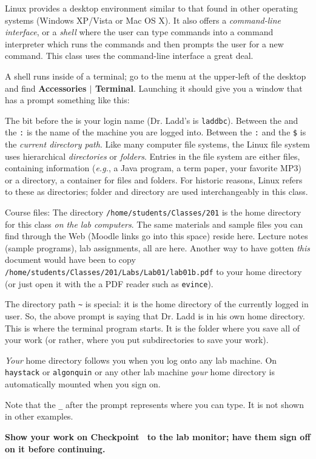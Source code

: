 \documentclass[12pt,twoside]{memoir}
\begin{document}
\begin{Exercise}[name={Checkpoint},title={Launch a terminal.}]
  Linux provides a desktop environment similar to that found in other
  operating systems (Windows XP/Vista or Mac OS X). It also offers a
  \emph{command-line interface}, or a \emph{shell} where the user can
  type commands into a command interpreter which runs the commands and
  then prompts the user for a new command. This class uses the
  command-line interface a great deal.

  A shell runs inside of a terminal; go to the menu at the upper-left
  of the desktop and find \textbf{Accessories $|$ Terminal}. Launching
  it should give you a window that has a prompt something like this:



The bit before the \texttt{\@} is your login name (Dr. Ladd's is
\texttt{laddbc}). Between the \texttt{\@} and the \texttt{:} is the name 
of the machine you are logged into. Between the
\texttt{:} and the \texttt{\$} is the \emph{current directory path}. 
Like many computer file systems, the Linux file system uses
 hierarchical \emph{directories} or \emph{folders}. Entries in the 
file system are either files, containing information (\emph{e.g.}, a
Java program, a term paper, your favorite MP3) or a directory, a
container for files and folders. For historic reasons, Linux
refers to these as directories; folder and directory are used
interchangeably in this class.

Course files: The directory \texttt{/home/students/Classes/201} is the
home directory for this class \emph{on the lab computers}. The same
materials and sample files you can find through the Web (Moodle links
go into this space) reside here. Lecture notes (sample programs), lab
assignments, all are here. Another way to have gotten \emph{this}
document would have been to copy
\texttt{/home/students/Classes/201/Labs/Lab01/lab01b.pdf} to your home
directory (or just open it with the a PDF reader such as
\texttt{evince}).

The directory path \texttt{\~} is special: it is the home directory of
the currently logged in user. So, the above prompt is saying that
Dr. Ladd is in his own home directory. This is where the terminal
program starts. It is the folder where you save all of your work (or
rather, where you put subdirectories to save your work). 

\emph{Your} home directory follows you when you log onto any lab
machine. On \texttt{haystack} or \texttt{algonquin} or any
other lab machine \emph{your} home directory is automatically mounted
when you sign on.

Note that the \texttt{\_} after the prompt represents where you can
type. It is not shown in other examples.
\end{Exercise}
\noindent
\textbf{Show your work on Checkpoint~\theExercise{} to the lab monitor;
  have them sign off on it before continuing.}
\end{document}

